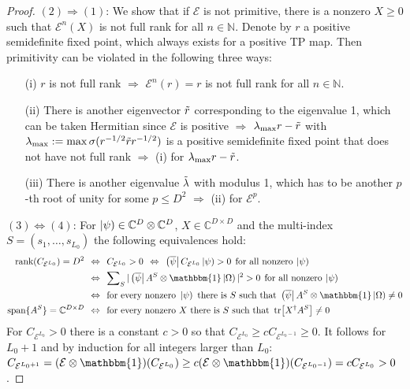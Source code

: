 \begin{proof}
\noindent $(2) \Rightarrow (1)$: We show that if $\mathcal{E}$ is not primitive, there is a nonzero $X \geq 0$ such that $\mathcal{E}^n(X)$ is not full rank for all $n \in \mathbb{N}$. Denote by $r$ a positive semidefinite fixed point, which always exists for a positive TP map. Then primitivity can be violated in the following three ways:
\begin{enumerate}
	\item[(i)] $r$ is not full rank \:$\Rightarrow$\: $\mathcal{E}^n(r) = r$ is not full rank for all $n \in \mathbb{N}$.
	\item[(ii)] There is another eigenvector $\Tilde{r}$ corresponding to the eigenvalue 1, which can be taken Hermitian since $\mathcal{E}$ is positive \:$\Rightarrow$\: $\lambda_{\mathrm{max}} r - \Tilde{r}$ with $\lambda_{\mathrm{max}} := \max \sigma(r^{-1/2}\Tilde{r}r^{-1/2})$ is a positive semidefinite fixed point that does not have not full rank $\Rightarrow$ (i) for $\lambda_{\mathrm{max}} r - \Tilde{r}$.
	\item[(iii)] There is another eigenvalue $\Tilde{\lambda}$ with modulus 1, which has to be another $p$-th root of unity for some $p \leq D^2$ \:$\Rightarrow$\: (ii) for $\mathcal{E}^p$. 
\end{enumerate}

\noindent$(3) \Leftrightarrow (4)$: For $\left| \psi \right) \in\mathbb{C}^D\otimes\mathbb{C}^D$, $X \in \mathbb{C}^{D \times D}$ and the multi-index $S = (s_1, \ldots, s_{L_0})$ the following equivalences hold:
\begin{align}
\begin{split}
\mathrm{rank}(C_{\mathcal{E}^{L_0}}) = D^2 &\:\:\Leftrightarrow\:\: C_{\mathcal{E}^{L_0}} > 0 \:\:\Leftrightarrow\:\: \tbra{\overline{\psi}} C_{\mathcal{E}^{L_0}} \tket{\psi} > 0 \:\:\text{for all nonzero}\: \tket{\psi} \\
&\:\:\Leftrightarrow\:\: \sum\nolimits_S \vert \tbra{\overline{\psi}} A^S \otimes \mathbbm{1}\tket{\Omega} \vert^2 > 0 \:\:\text{for all nonzero}\: \tket{\psi} \\
&\:\:\Leftrightarrow\:\: \text{for every nonzero } \tket{\psi} \text{ there is } S \text{ such that } \tbra{\overline{\psi}} A^S \otimes \mathbbm{1}\tket{\Omega} \neq 0 \\
\mathrm{span}\{A^S\} = \mathbb{C}^{D \times D} &\:\:\Leftrightarrow\:\: \text{for every nonzero } X \text{ there is } S \text{ such that } \tr[X^{\dagger} A^S] \neq 0 \\
\end{split}
\end{align} 
For $C_{\mathcal{E}^{L_0}} > 0$ there is a constant $c > 0$ so that $C_{\mathcal{E}^{L_0}} \geq cC_{\mathcal{E}^{L_0-1}} \geq 0$. It follows for $L_0+1$ and by induction for all integers larger than $L_0$: $C_{\mathcal{E}^{L_0+1}} = (\mathcal{E} \otimes \mathbbm{1})(C_{\mathcal{E}^{L_0}}) \geq c (\mathcal{E} \otimes \mathbbm{1})(C_{\mathcal{E}^{L_0-1}}) = cC_{\mathcal{E}^{L_0}} > 0$.
\end{proof}


